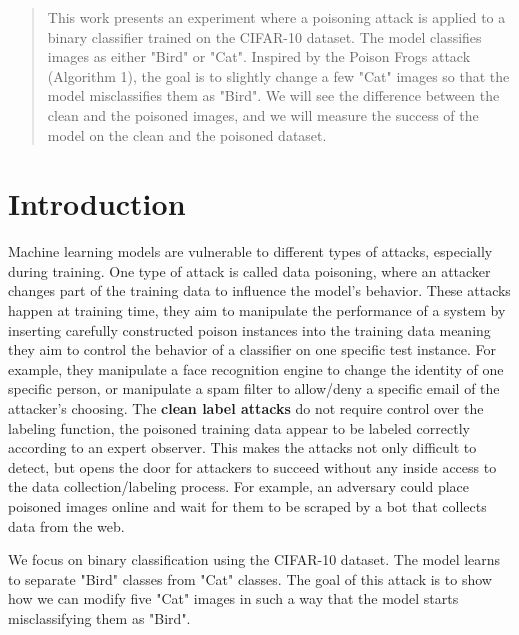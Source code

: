 \begin{abstract}
    This work presents an experiment where a poisoning attack is applied to a binary classifier trained on the CIFAR-10 dataset. 
    The model classifies images as either "Bird" or "Cat". Inspired by the Poison Frogs attack (Algorithm 1), the goal is to slightly change a few "Cat" images so that the model misclassifies them as "Bird". 
    We will see the difference between the clean and the poisoned images, and we will measure the success of the model on the clean and the poisoned dataset.
\end{abstract}
\section{Introduction}
Machine learning models are vulnerable to different types of attacks, especially during training. One type of attack is called data poisoning, where an attacker changes part of the training data to influence the model’s behavior. These attacks happen at training time, they aim to manipulate
the performance of a system by inserting carefully constructed poison instances into the training data meaning they aim to control the behavior of a classifier on one specific test instance. For example, they manipulate a face recognition
engine to change the identity of one specific person, or manipulate a spam filter to allow/deny a specific email of the attacker’s choosing. The \textbf{clean label attacks} do not require control over the labeling function, the poisoned training data appear to be labeled correctly according to an expert observer. This makes the attacks not only difficult to detect, but opens the door for attackers to
succeed without any inside access to the data collection/labeling process. For example, an adversary could place poisoned images online and wait for them to be scraped by a bot that collects data from the web.

We focus on binary classification using the CIFAR-10 dataset. The model learns to separate "Bird" classes from "Cat" classes. The goal of this attack is to show how we can modify five "Cat" images in such a way that the model starts misclassifying them as "Bird".
